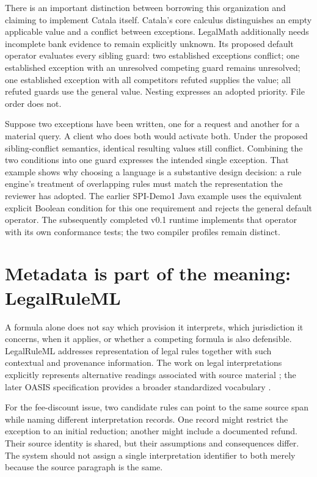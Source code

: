 \documentclass[12pt,a4paper,oneside,openany]{book}
\begin{document}
There is an important distinction between borrowing this organization and
claiming to implement Catala itself. Catala's core calculus distinguishes an
empty applicable value and a conflict between exceptions. LegalMath additionally
needs incomplete bank evidence to remain explicitly unknown. Its proposed
default operator evaluates every sibling guard: two established exceptions
conflict; one established exception with an unresolved competing guard remains
unresolved; one established exception with all competitors refuted supplies the
value; all refuted guards use the general value. Nesting expresses an adopted
priority. File order does not.

Suppose two exceptions have been written, one for a request and another for a
material query. A client who does both would activate both. Under the proposed
sibling-conflict semantics, identical resulting values still conflict. Combining
the two conditions into one guard expresses the intended single exception.
That example shows why choosing a language is a substantive design decision:
a rule engine's treatment of overlapping rules must match the representation
the reviewer has adopted. The earlier SPI-Demo1 Java example uses the equivalent explicit Boolean
condition for this one requirement and rejects the general default operator.
The subsequently completed v0.1 runtime implements that operator with its own
conformance tests; the two compiler profiles remain distinct.

\section{Metadata is part of the meaning: LegalRuleML}
\label{merge:M04:04}

\label{sec:languages-legalruleml}
A formula alone does not say which provision it interprets, which jurisdiction
it concerns, when it applies, or whether a competing formula is also
defensible. LegalRuleML addresses representation of legal rules together with
such contextual and provenance information. The work on legal interpretations
explicitly represents alternative readings associated with source material
\citep[secs.~2--4]{legalinterpretations2014}; the later OASIS specification
provides a broader standardized vocabulary \citep{legalruleml2021}.

For the fee-discount issue, two candidate rules can point to the same source
span while naming different interpretation records. One record might restrict
the exception to an initial reduction; another might include a documented
refund. Their source identity is shared, but their assumptions and consequences
differ. The system should not assign a single interpretation identifier to
both merely because the source paragraph is the same.
\end{document}
